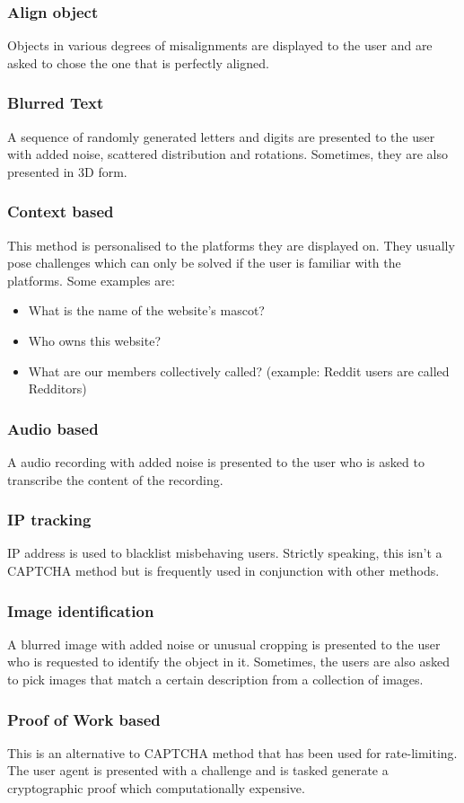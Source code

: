 \documentclass[conference]{IEEEtran}
\begin{document}
\subsubsection{Align object}
Objects in various degrees of misalignments are displayed to the user and are
asked to chose the one that is perfectly aligned.

\subsubsection{Blurred Text}
A sequence of randomly generated letters and digits are 
		presented to the user with added noise, scattered distribution and
		rotations. Sometimes, they are also presented in 3D form. 

\subsubsection{Context based}
This method is personalised to the platforms they are displayed on. They usually
pose challenges which can only be solved if the user is familiar with the
platforms. Some examples are:
	\begin{itemize}
		\item What is the name of the website's mascot?  
		\item Who owns this website?
		\item What are our members collectively called? (example: Reddit users are
			called Redditors)
	\end{itemize}

\subsubsection{Audio based}
A audio recording with added noise is presented to the user who is asked to
transcribe the content of the recording.

\subsubsection{IP tracking}
IP address is used to blacklist misbehaving users. Strictly speaking, this isn't
a CAPTCHA method but is frequently used in conjunction with other methods.

\subsubsection{Image identification}
A blurred image with added noise or unusual cropping is presented to the user
who is requested to identify the object in it. Sometimes, the users are also
asked to pick images that match a certain description from a collection of
images.

\subsubsection{Proof of Work based}
This is an alternative to CAPTCHA method that has been used for rate-limiting.
The user agent is presented with a challenge and is tasked generate a
cryptographic proof which computationally expensive.
\end{document}
